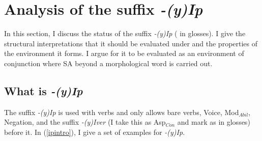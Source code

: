 \section{Analysis of the suffix \textit{-(y)Ip}} 

In this section, I discuss the status of the suffix \textit{-(y)Ip} ({\Pc} in glosses). I give the structural interpretations that it should be evaluated under and the properties of the environment it forms. I argue for it to be evaluated as an environment of conjunction where SA beyond a morphological word is carried out.

\subsection{What is \textit{-(y)Ip}}

The suffix \textit{-(y)Ip} is used with verbs and only allows bare verbs, Voice, Mod$_{Abil}$, Negation, and the  suffix \textit{-(y)Iver} (I take this as Asp$_{Con}$ \citep{cinque1999adverbs} and mark as {\Con} in glosses) before it.  In (\ref{ipintro}), I give a set of examples for \textit{-(y)Ip}.

